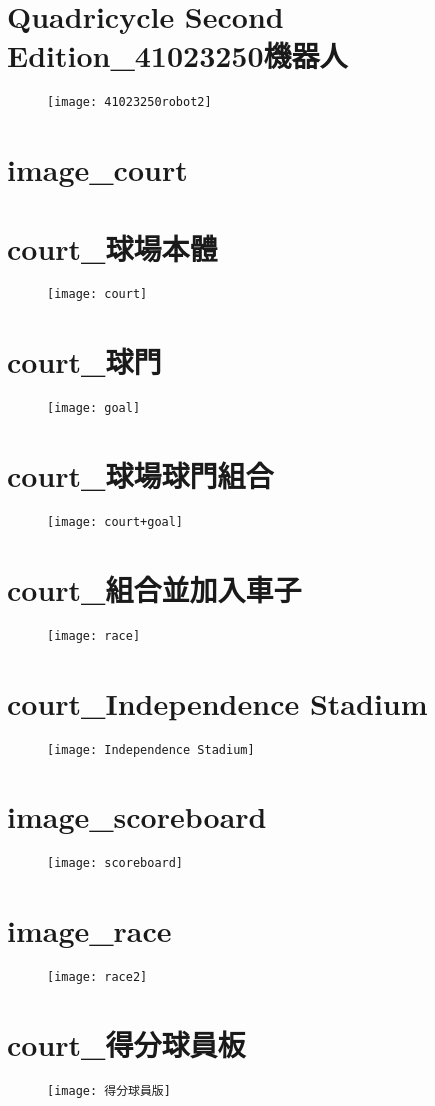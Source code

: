 \section{Quadricycle Second Edition\_41023250機器人}
\begin{figure}
\texttt{[image: 41023250robot2]}
\end{figure}
\section{image\_court}
\section{court\_球場本體}
\begin{figure}
\texttt{[image: court]}
\end{figure}
\section{court\_球門}
\begin{figure}
\texttt{[image: goal]}
\end{figure}
\section{court\_球場球門組合}
\begin{figure}
\texttt{[image: court+goal]}
\end{figure}
\section{court\_組合並加入車子}
\begin{figure}
\texttt{[image: race]}
\end{figure}
\section{court\_Independence Stadium}
\begin{figure}
\texttt{[image: Independence Stadium]}
\end{figure}
\section{image\_scoreboard}
\begin{figure}
\texttt{[image: scoreboard]}
\end{figure}
\section{image\_race}
\begin{figure}
\texttt{[image: race2]}
\end{figure}
\section{court\_得分球員板}
\begin{figure}
\texttt{[image: 得分球員版]}
\end{figure}


